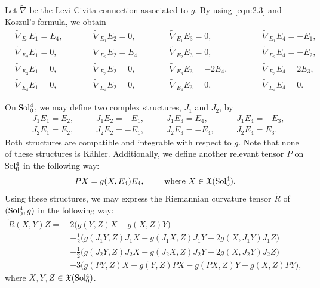 \documentclass[reqno]{amsart}%
\theoremstyle{definition}
\numberwithin{equation}{section}
\begin{document}
	Let $\tilde{\nabla}$ be the Levi-Civita connection associated to $g$.
	By using \eqref{eqn:2.3} and Koszul's formula, we obtain
	\begin{equation}\label{eqn:2.6}
		\begin{alignedat}{4}
			&\tilde{\nabla}_{E_1}E_1=E_4, \qquad 
			&&\tilde{\nabla}_{E_1}E_2=0, \qquad
			&&\tilde{\nabla}_{E_1}E_3=0, \qquad
			&&\tilde{\nabla}_{E_1}E_4=-E_1, \\
			&\tilde{\nabla}_{E_2}E_1=0, \qquad 
			&&\tilde{\nabla}_{E_2}E_2=E_4\qquad \
			&&\tilde{\nabla}_{E_2}E_3=0, \qquad
			&&\tilde{\nabla}_{E_2}E_4=-E_2, \\
			&\tilde{\nabla}_{E_3}E_1=0, \qquad 
			&&\tilde{\nabla}_{E_3}E_2=0, \qquad
			&&\tilde{\nabla}_{E_3}E_3=-2E_4, \qquad \ \
			&&\tilde{\nabla}_{E_3}E_4=2E_3, \\
			&\tilde{\nabla}_{E_4}E_1=0, \qquad 
			&&\tilde{\nabla}_{E_4}E_2=0, \qquad
			&&\tilde{\nabla}_{E_4}E_3=0, \qquad
			&&\tilde{\nabla}_{E_4}E_4=0.
		\end{alignedat}
	\end{equation}
	
	On ${\rm Sol_0^4}$, we may define two complex structures, $J_1$ and $J_2$, by
	\begin{equation}\label{eqn:2.5}
		\begin{alignedat}{4}
			&J_1E_1=E_2, \quad &&J_1E_2=-E_1, \quad
			&&J_1E_3=E_4, \quad &&J_1E_4=-E_3, \\
			&J_2E_1=E_2, \quad &&J_2E_2=-E_1, \quad
			&&J_2E_3=-E_4, \quad &&J_2E_4=E_3.
		\end{alignedat}
	\end{equation}
	Both structures are compatible and integrable with respect to $g$.
	Note that none of these structures is K\"ahler.
	Additionally, we define another relevant tensor $P$ on ${\rm Sol_0^4}$ in the following way:
	\begin{equation}\label{eqn:2.49}
		PX=g(X,E_4)E_4, \qquad \text{ where }  X\in \mathfrak X({\rm Sol_0^4}).
	\end{equation}
	Using these structures, we may express the Riemannian curvature tensor $\tilde{R}$ of $({\rm Sol_0^4},g)$
	in the following way:
	\begin{equation}\label{eqn:2.7}
		\begin{aligned}
			\tilde{R}(X,Y)Z=\ 
			&2\big(g(Y,Z)X-g(X,Z)Y\big)\\
			&-\tfrac{1}{2}\big(g(J_1Y,Z)J_1X-g(J_1X,Z)J_1Y+2g(X,J_1Y)J_1Z\big)\\
			&-\tfrac{1}{2}\big(g(J_2Y,Z)J_2X-g(J_2X,Z)J_2Y+2g(X,J_2Y)J_2Z\big)\\
			&-3\big(g(PY,Z)X+g(Y,Z)PX-g(PX,Z)Y-g(X,Z)PY\big),
		\end{aligned}
	\end{equation}
	where $X, Y, Z\in \mathfrak X({\rm Sol_0^4})$.
	
\end{document}
